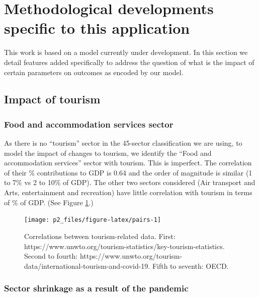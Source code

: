 \documentclass[
]{article}
\begin{document}
\newpage

\hypertarget{methodological-developments-specific-to-this-application}{%
\section{Methodological developments specific to this application}\label{methodological-developments-specific-to-this-application}}

This work is based on a model currently under development. In this section we detail features added specifically to address the question of what is the impact of certain parameters on outcomes as encoded by our model.

\hypertarget{impact-of-tourism}{%
\subsection{Impact of tourism}\label{impact-of-tourism}}

\hypertarget{food-and-accommodation-services-sector}{%
\subsubsection{Food and accommodation services sector}\label{food-and-accommodation-services-sector}}

As there is no ``tourism'' sector in the 45-sector classification we are using, to model the impact of changes to tourism, we identify the ``Food and accommodation services'' sector with tourism. This is imperfect. The correlation of their \% contributions to GDP is 0.64 and the order of magnitude is similar (1 to 7\% vs 2 to 10\% of GDP). The other two sectors considered (Air transport and Arts, entertainment and recreation) have little correlation with tourism in terms of \% of GDP. (See Figure \ref{fig:pairs}.)

\begin{figure}

{\centering \texttt{[image: p2\_files/figure-latex/pairs-1]} 

}

\caption{Correlations between tourism-related data. First: https://www.unwto.org/tourism-statistics/key-tourism-statistics. Second to fourth: https://www.unwto.org/tourism-data/international-tourism-and-covid-19. Fifth to seventh: OECD.}\label{fig:pairs}
\end{figure}

\newpage

\hypertarget{sector-shrinkage-as-a-result-of-the-pandemic}{%
\subsubsection{Sector shrinkage as a result of the pandemic}\label{sector-shrinkage-as-a-result-of-the-pandemic}}
\end{document}
